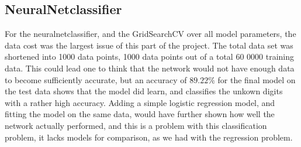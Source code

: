 \subsection{NeuralNetclassifier}
For the neuralnetclassifier, and the GridSearchCV over
all model parameters, the data cost was the largest issue 
of this part of the project. The total data set was shortened into
1000 data points, 1000 data points out of a total 60 0000 training data.
This could lead one to think that the network would not 
have enough data to become sufficiently accurate, but an
accuracy of $89.22\%$ for the final model on the test data
shows that the model did learn, and classifies the unkown digits
with a rather high accuracy. 
Adding a simple logistic regression model, and 
fitting the model on the same data, would have further shown
how well the network actually performed, and this is a 
problem with this classification problem, it lacks models
for comparison, as we had with the regression problem.
 

